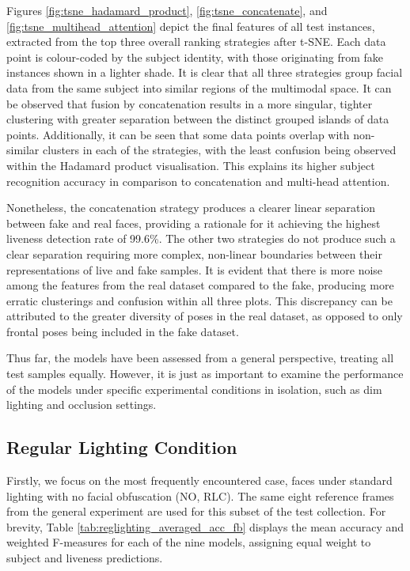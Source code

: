 \documentclass{mpaper}
\begin{document}
Figures \ref{fig:tsne_hadamard_product}, \ref{fig:tsne_concatenate}, and \ref{fig:tsne_multihead_attention} depict the final features of all test instances, extracted from the top three overall ranking strategies after t-SNE. Each data point is colour-coded by the subject identity, with those originating from fake instances shown in a lighter shade. It is clear that all three strategies group facial data from the same subject into similar regions of the multimodal space. It can be observed that fusion by concatenation results in a more singular, tighter clustering with greater separation between the distinct grouped islands of data points. Additionally, it can be seen that some data points overlap with non-similar clusters in each of the strategies, with the least confusion being observed within the Hadamard product visualisation. This explains its higher subject recognition accuracy in comparison to concatenation and multi-head attention. 

Nonetheless, the concatenation strategy produces a clearer linear separation between fake and real faces, providing a rationale for it achieving the highest liveness detection rate of 99.6\%. The other two strategies do not produce such a clear separation requiring more complex, non-linear boundaries between their representations of live and fake samples. It is evident that there is more noise among the features from the real dataset compared to the fake, producing more erratic clusterings and confusion within all three plots. This discrepancy can be attributed to the greater diversity of poses in the real dataset, as opposed to only frontal poses being included in the fake dataset. 

Thus far, the models have been assessed from a general perspective, treating all test samples equally. However, it is just as important to examine the performance of the models under specific experimental conditions in isolation, such as dim lighting and occlusion settings.


\subsection{Regular Lighting Condition}
Firstly, we focus on the most frequently encountered case, faces under standard lighting with no facial obfuscation \linebreak (NO, RLC). The same eight reference frames from the general experiment are used for this subset of the test collection. For brevity, Table \ref{tab:reglighting_averaged_acc_fb} displays the mean accuracy and weighted F-measures for each of the nine models, assigning equal weight to subject and liveness predictions. 
\end{document}
